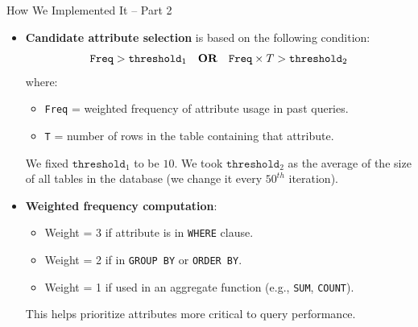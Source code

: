 \documentclass[Serif, 10pt, brown]{beamer}
\theoremstyle{example}
\theoremstyle{plain}
\begin{document}
\begin{frame}{How We Implemented It – Part 2}
	\begin{itemize}
		\item \textbf{Candidate attribute selection} is based on the following condition:
		\vspace{-5pt}
		\[
		\texttt{Freq} > \texttt{threshold}_1 \quad \textbf{OR} \quad \texttt{Freq} \times T > \texttt{threshold}_2
		\vspace{-5pt}
		\]
		where:
		\begin{itemize}
			\item \texttt{Freq} = weighted frequency of attribute usage in past queries.
			\item \texttt{T} = number of rows in the table containing that attribute.
		\end{itemize}
		We fixed $\texttt{threshold}_1$ to be $10$. We took $\texttt{threshold}_2$ as the average of the size of all tables in the database (we change it every $50^{th}$ iteration).
	
		\item \textbf{Weighted frequency computation}:
		\begin{itemize}
			\item Weight = 3 if attribute is in \texttt{WHERE} clause.
			\item Weight = 2 if in \texttt{GROUP BY} or \texttt{ORDER BY}.
			\item Weight = 1 if used in an aggregate function (e.g., \texttt{SUM}, \texttt{COUNT}).
		\end{itemize}
		This helps prioritize attributes more critical to query performance.
	\end{itemize}
\end{frame}
\end{document}
